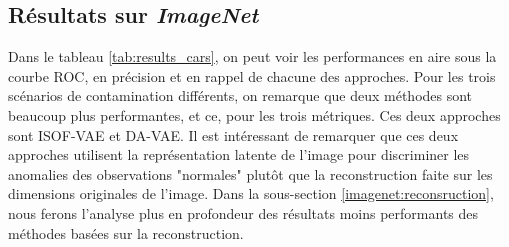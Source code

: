 \subsection{Résultats sur \textit{ImageNet}} \label{imagenet_results}

Dans le tableau \ref{tab:results_cars}, on peut voir les performances en aire sous la courbe ROC, en précision et en rappel de chacune des approches. Pour les trois scénarios de contamination différents, on remarque que deux méthodes sont beaucoup plus performantes, et ce, pour les trois métriques. Ces deux approches sont ISOF-VAE et DA-VAE. Il est intéressant de remarquer que ces deux approches utilisent la représentation latente de l'image pour discriminer les anomalies des observations "normales" plutôt que la reconstruction faite sur les dimensions originales de l'image. Dans la sous-section \ref{imagenet:reconsruction}, nous ferons l'analyse plus en profondeur des résultats moins performants des méthodes basées sur la reconstruction.

